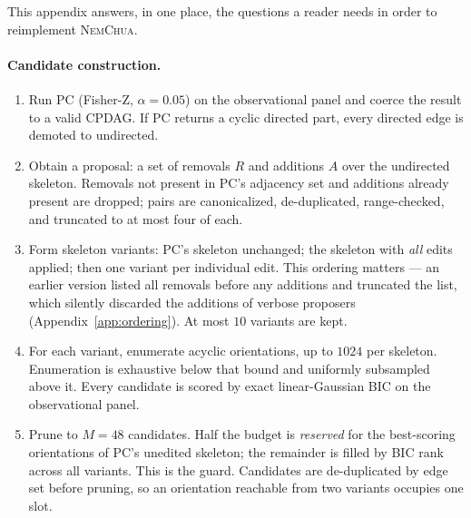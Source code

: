 \documentclass{article}
\newcommand{\nem}{\textsc{NemChua}}
\begin{document}
This appendix answers, in one place, the questions a reader needs in order to reimplement \nem{}.

\paragraph{Candidate construction.}
\begin{enumerate}[leftmargin=1.4em,itemsep=1pt,topsep=2pt]
\item Run PC (Fisher-Z, $\alpha=0.05$) on the observational panel and coerce the result to a valid
CPDAG. If PC returns a cyclic directed part, every directed edge is demoted to undirected.
\item Obtain a proposal: a set of removals $R$ and additions $A$ over the undirected skeleton.
Removals not present in PC's adjacency set and additions already present are dropped; pairs are
canonicalized, de-duplicated, range-checked, and truncated to at most four of each.
\item Form skeleton variants: PC's skeleton unchanged; the skeleton with \emph{all} edits applied;
then one variant per individual edit. This ordering matters --- an earlier version listed all
removals before any additions and truncated the list, which silently discarded the additions of
verbose proposers (Appendix~\ref{app:ordering}). At most $10$ variants are kept.
\item For each variant, enumerate acyclic orientations, up to $1024$ per skeleton. Enumeration is
exhaustive below that bound and uniformly subsampled above it. Every candidate is scored by exact
linear-Gaussian BIC on the observational panel.
\item Prune to $M=48$ candidates. Half the budget is \emph{reserved} for the best-scoring
orientations of PC's unedited skeleton; the remainder is filled by BIC rank across all variants.
This is the guard. Candidates are de-duplicated by edge set before pruning, so an orientation
reachable from two variants occupies one slot.
\end{enumerate}
\end{document}
